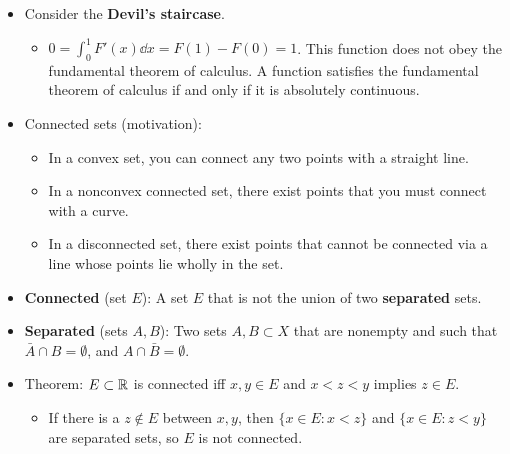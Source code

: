 \documentclass[../../notes.tex]{subfiles}
\begin{document}
\begin{itemize}
\begin{itemize}
\begin{itemize}
        \end{itemize}
    \end{itemize}
    \item Consider the \textbf{Devil's staircase}.
    \begin{itemize}
        \item $0=\int_0^1F'(x)\dd{x}=F(1)-F(0)=1$. This function does not obey the fundamental theorem of calculus. A function satisfies the fundamental theorem of calculus if and only if it is absolutely continuous.
    \end{itemize}
    \item Connected sets (motivation):
    \begin{itemize}
        \item In a convex set, you can connect any two points with a straight line.
        \item In a nonconvex connected set, there exist points that you must connect with a curve.
        \item In a disconnected set, there exist points that cannot be connected via a line whose points lie wholly in the set.
    \end{itemize}
    \item \textbf{Connected} (set $E$): A set $E$ that is not the union of two \textbf{separated} sets.
    \item \textbf{Separated} (sets $A,B$): Two sets $A,B\subset X$ that are nonempty and such that $\bar{A}\cap B=\emptyset$, and $A\cap\bar{B}=\emptyset$.
    \item Theorem: $E\subset\mathbb{R}$ is connected iff $x,y\in E$ and $x<z<y$ implies $z\in E$.
    \begin{itemize}
        \item If there is a $z\notin E$ between $x,y$, then $\{x\in E:x<z\}$ and $\{x\in E:z<y\}$ are separated sets, so $E$ is not connected.
    \end{itemize}
\end{itemize}
\end{document}
